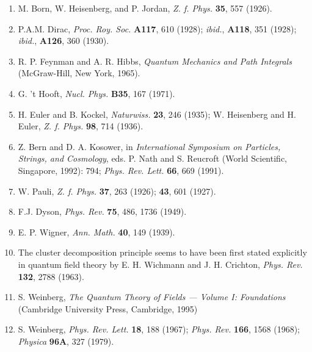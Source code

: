 \begin{enumerate}

\item M. Born, W. Heisenberg, and P. Jordan, {\it Z. f.
Phys.} {\bf 35}, 557 (1926).

\item P.A.M. Dirac, {\it Proc. Roy. Soc.}   {\bf A117}, 610
(1928); {\it ibid.}, {\bf A118}, 351 (1928); {\it ibid.},
{\bf A126}, 360 (1930).

\item R. P. Feynman and A. R. Hibbs, {\it Quantum Mechanics
and Path Integrals} (McGraw-Hill, New York, 1965).

\item G. 't Hooft, {\em Nucl. Phys.} {\bf B35}, 167 (1971).

\item H. Euler and B. Kockel, {\it Naturwiss.} {\bf 23}, 246
(1935); W. Heisenberg and H. Euler,  {\it Z. f. Phys.} {\bf
98}, 714 (1936).



\item Z. Bern and D. A. Kosower, in {\em International
Symposium on Particles, Strings, and Cosmology}, eds. P.
Nath and S. Reucroft (World Scientific, Singapore, 1992):
794; {\it Phys. Rev. Lett.} {\bf 66}, 669 (1991).

\item W. Pauli, {\it Z. f. Phys.} {\bf 37}, 263 (1926); {\bf
43}, 601 (1927).

\item F.J. Dyson, {\it Phys. Rev.} {\bf 75}, 486, 1736
(1949).

\item E. P. Wigner, {\it Ann. Math.} {\bf 40}, 149 (1939).

\item The cluster decomposition principle seems to have been
first stated explicitly in quantum field theory by E. H.
Wichmann and J. H. Crichton, {\it Phys. Rev.} {\bf 132},
2788 (1963).

\item S. Weinberg, {\em The Quantum Theory  of Fields ---
Volume I:
Foundations}~
(Cambridge University Press, Cambridge, 1995)

\item S. Weinberg, {\em Phys. Rev. Lett.} {\bf 18}, 188
(1967); {\it Phys. Rev.} {\bf 166}, 1568 (1968); {\it
Physica} {\bf 96A}, 327 (1979).


\end{enumerate}
